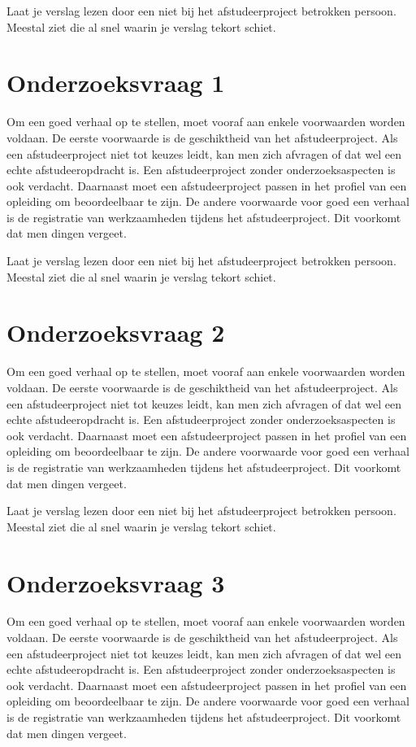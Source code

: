 		
		Laat je verslag lezen door een niet bij het afstudeerproject betrokken
		persoon. Meestal ziet die al snel waarin je verslag tekort schiet.
		
		
		
		\section{Onderzoeksvraag 1}
		Om een goed verhaal op te stellen, moet vooraf aan enkele voorwaarden
		worden voldaan. De eerste voorwaarde is de geschiktheid van het
		afstudeerproject. Als een afstudeerproject niet tot keuzes leidt, kan
		men zich afvragen of dat wel een echte afstudeeropdracht is. Een
		afstudeerproject zonder onderzoeksaspecten is ook verdacht. Daarnaast
		moet een afstudeerproject passen in het profiel van een opleiding om
		beoordeelbaar te zijn. De andere voorwaarde voor goed een verhaal is
		de registratie van werkzaamheden tijdens het afstudeerproject. Dit
		voorkomt dat men dingen vergeet.
		
		
		Laat je verslag lezen door een niet bij het afstudeerproject betrokken
		persoon. Meestal ziet die al snel waarin je verslag tekort schiet.
		\section{Onderzoeksvraag 2 }
		Om een goed verhaal op te stellen, moet vooraf aan enkele voorwaarden
		worden voldaan. De eerste voorwaarde is de geschiktheid van het
		afstudeerproject. Als een afstudeerproject niet tot keuzes leidt, kan
		men zich afvragen of dat wel een echte afstudeeropdracht is. Een
		afstudeerproject zonder onderzoeksaspecten is ook verdacht. Daarnaast
		moet een afstudeerproject passen in het profiel van een opleiding om
		beoordeelbaar te zijn. De andere voorwaarde voor goed een verhaal is
		de registratie van werkzaamheden tijdens het afstudeerproject. Dit
		voorkomt dat men dingen vergeet.
		
		
		Laat je verslag lezen door een niet bij het afstudeerproject betrokken
		persoon. Meestal ziet die al snel waarin je verslag tekort schiet.
		\section{Onderzoeksvraag 3 }
		Om een goed verhaal op te stellen, moet vooraf aan enkele voorwaarden
		worden voldaan. De eerste voorwaarde is de geschiktheid van het
		afstudeerproject. Als een afstudeerproject niet tot keuzes leidt, kan
		men zich afvragen of dat wel een echte afstudeeropdracht is. Een
		afstudeerproject zonder onderzoeksaspecten is ook verdacht. Daarnaast
		moet een afstudeerproject passen in het profiel van een opleiding om
		beoordeelbaar te zijn. De andere voorwaarde voor goed een verhaal is
		de registratie van werkzaamheden tijdens het afstudeerproject. Dit
		voorkomt dat men dingen vergeet.
		
